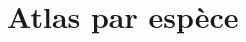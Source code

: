 \documentclass[a4paper,twoside,english]{article}
\begin{document}
%

\twocolumn


\section{Atlas par espèce}
\clearpage


\onecolumn
\end{document}
